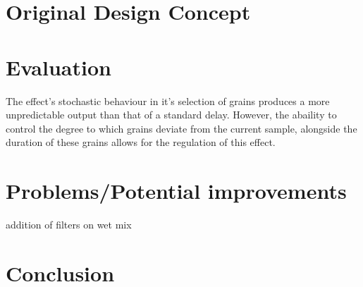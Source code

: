 \documentclass[titlepage]{scrartcl}
\begin{document}
\section{Original Design Concept}\label{OriginalDesign}

\section{Evaluation}
The effect's stochastic behaviour in it's selection of grains produces a more
unpredictable output than that of a standard delay. However, the abaility to
control the degree to which grains deviate from the current sample, alongside
the duration of these grains allows for the regulation of this effect.
\section{Problems/Potential improvements}
addition of filters on wet mix
\section{Conclusion}
\end{document}
